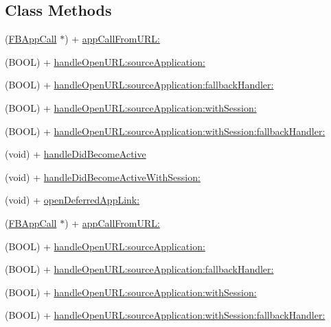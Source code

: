 \subsection*{Class Methods}
\begin{DoxyCompactItemize}
\item 
(\hyperlink{interfaceFBAppCall}{F\+B\+App\+Call} $\ast$) + \hyperlink{interfaceFBAppCall_a03baee771317510fb167dad8926bc176}{app\+Call\+From\+U\+R\+L\+:}
\item 
(B\+O\+OL) + \hyperlink{interfaceFBAppCall_a199dea04bcd5f045d222a0c98901a3b9}{handle\+Open\+U\+R\+L\+:source\+Application\+:}
\item 
(B\+O\+OL) + \hyperlink{interfaceFBAppCall_ad685be8d03104cb8aa1f2b6ccf770d5d}{handle\+Open\+U\+R\+L\+:source\+Application\+:fallback\+Handler\+:}
\item 
(B\+O\+OL) + \hyperlink{interfaceFBAppCall_af20b1ba0f8f11d335d8ca28b2450cf9d}{handle\+Open\+U\+R\+L\+:source\+Application\+:with\+Session\+:}
\item 
(B\+O\+OL) + \hyperlink{interfaceFBAppCall_aab019d4dfc227c0a69627e9f666905ea}{handle\+Open\+U\+R\+L\+:source\+Application\+:with\+Session\+:fallback\+Handler\+:}
\item 
(void) + \hyperlink{interfaceFBAppCall_ae38f6595e03e0ba2c44670e7ff579a70}{handle\+Did\+Become\+Active}
\item 
(void) + \hyperlink{interfaceFBAppCall_aa00467d180eab724577daeeb205524a4}{handle\+Did\+Become\+Active\+With\+Session\+:}
\item 
(void) + \hyperlink{interfaceFBAppCall_a02498c71e0be169b1ae49136d1446a23}{open\+Deferred\+App\+Link\+:}
\item 
(\hyperlink{interfaceFBAppCall}{F\+B\+App\+Call} $\ast$) + \hyperlink{interfaceFBAppCall_a03baee771317510fb167dad8926bc176}{app\+Call\+From\+U\+R\+L\+:}
\item 
(B\+O\+OL) + \hyperlink{interfaceFBAppCall_a199dea04bcd5f045d222a0c98901a3b9}{handle\+Open\+U\+R\+L\+:source\+Application\+:}
\item 
(B\+O\+OL) + \hyperlink{interfaceFBAppCall_ad685be8d03104cb8aa1f2b6ccf770d5d}{handle\+Open\+U\+R\+L\+:source\+Application\+:fallback\+Handler\+:}
\item 
(B\+O\+OL) + \hyperlink{interfaceFBAppCall_af20b1ba0f8f11d335d8ca28b2450cf9d}{handle\+Open\+U\+R\+L\+:source\+Application\+:with\+Session\+:}
\item 
(B\+O\+OL) + \hyperlink{interfaceFBAppCall_aab019d4dfc227c0a69627e9f666905ea}{handle\+Open\+U\+R\+L\+:source\+Application\+:with\+Session\+:fallback\+Handler\+:}

\end{DoxyCompactItemize}
